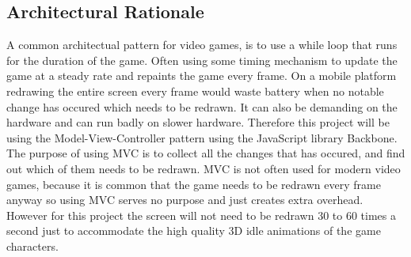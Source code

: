 \subsection{Architectural Rationale}

A common architectual pattern for video games, is to use a while loop that runs for the duration of the game. Often using some timing mechanism to update the game at a steady rate and repaints the game every frame. On a mobile platform redrawing the entire screen every frame would waste battery when no notable change has occured which needs to be redrawn. It can also be demanding on the hardware and can run badly on slower hardware. Therefore this project will be using the Model-View-Controller pattern using the JavaScript library Backbone. The purpose of using MVC is to collect all the changes that has occured, and find out which of them needs to be redrawn. MVC is not often used for modern video games, because it is common that the game needs to be redrawn every frame anyway so using MVC serves no purpose and just creates extra overhead. However for this project the screen will not need to be redrawn 30 to 60 times a second just to accommodate the high quality 3D idle animations of the game characters.
